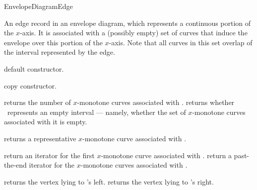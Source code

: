 
\ccRefPageBegin

\begin{ccRefConcept}{EnvelopeDiagramEdge}

\ccDefinition

An edge record in an envelope diagram, which represents a continuous portion
of the $x$-axis. It is associated with a (possibly empty) set of curves that
induce the envelope over this portion of the $x$-axis. Note that all curves
in this set overlap of the interval represented by the edge.

\ccTypes



\ccCreation
{}

    {default constructor.}
    
    {copy constructor.}

\ccAccessFunctions

    {returns the number of $x$-monotone curves associated with \ccVar.}
\ccGlue
{}
    {returns whether \ccVar\ represents an empty interval --- namely, whether the set of $x$-monotone curves associated with it is empty.}

    {returns a representative $x$-monotone curve associated with \ccVar.
     }

    {return an iterator for the first $x$-monotone curve associated with \ccVar.}
\ccGlue
{}
    {return a past-the-end iterator for the $x$-monotone curves associated with \ccVar.}

    {returns the vertex lying to \ccVar's left.}
\ccGlue
{}
    {returns the vertex lying to \ccVar's right.}


\end{ccRefConcept}
